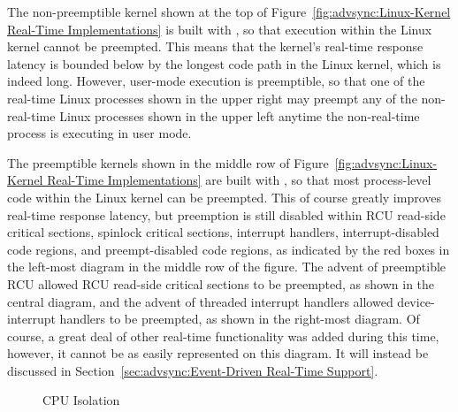 The non-preemptible kernel shown at the top of
Figure~\ref{fig:advsync:Linux-Kernel Real-Time Implementations}
is built with , so that execution within the Linux
kernel cannot be preempted.
This means that the kernel's real-time response latency is bounded below
by the longest code path in the Linux kernel, which is indeed long.
However, user-mode execution is preemptible, so that one of the
real-time Linux processes shown in the upper right may preempt any of the
non-real-time Linux processes shown in the upper left anytime the
non-real-time process is executing in user mode.

The preemptible kernels shown in the middle row of
Figure~\ref{fig:advsync:Linux-Kernel Real-Time Implementations}
are built with , so that most process-level code
within the Linux kernel can be preempted.
This of course greatly improves real-time response latency, but
preemption is still disabled
within RCU read-side critical sections,
spinlock critical sections,
interrupt handlers,
interrupt-disabled code regions, and
preempt-disabled code regions, as indicated by the red boxes in the
left-most diagram in the middle row of the figure.
The advent of preemptible RCU allowed RCU read-side critical sections
to be preempted, as shown in the central diagram,
and the advent of threaded interrupt handlers allowed device-interrupt
handlers to be preempted, as shown in the right-most diagram.
Of course, a great deal of other real-time functionality was added
during this time, however, it cannot be as easily represented on this
diagram.
It will instead be discussed in
Section~\ref{sec:advsync:Event-Driven Real-Time Support}.

\begin{figure}[tb]
\centering
{}
\caption{CPU Isolation}
\label{fig:advsync:CPU Isolation}
\end{figure}

